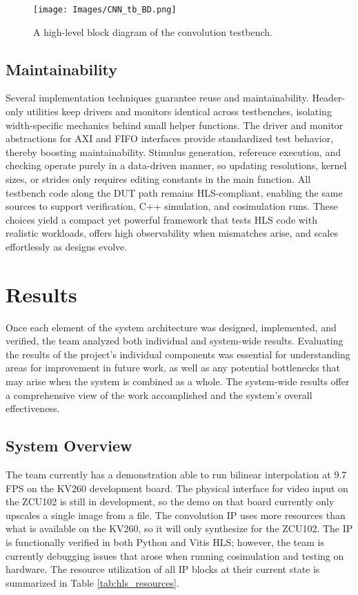 \documentclass{article}
\begin{document}
        \begin{figure}[!tb] 
            \centering
            \texttt{[image: Images/CNN\_tb\_BD.png]} 
            \caption{A high-level block diagram of the convolution testbench.} 
            \label{fig:CNN_tb_BD} 
        \end{figure}

    \subsection{Maintainability}
    \noindent Several implementation techniques guarantee reuse and maintainability. Header-only utilities keep drivers and monitors identical across testbenches, isolating width-specific mechanics behind small helper functions. The driver and monitor abstractions for AXI and FIFO interfaces provide standardized test behavior, thereby boosting maintainability. Stimulus generation, reference execution, and checking operate purely in a data-driven manner, so updating resolutions, kernel sizes, or strides only requires editing constants in the main function. All testbench code along the DUT path remains HLS-compliant, enabling the same sources to support verification, C++ simulation, and cosimulation runs. These choices yield a compact yet powerful framework that tests HLS code with realistic workloads, offers high observability when mismatches arise, and scales effortlessly as designs evolve.


\newpage\section{Results}
    \noindent Once each element of the system architecture was designed, implemented, and verified, the team analyzed both individual and system-wide results. Evaluating the results of the project’s individual components was essential for understanding areas for improvement in future work, as well as any potential bottlenecks that may arise when the system is combined as a whole. The system-wide results offer a comprehensive view of the work accomplished and the system’s overall effectiveness. 

    \subsection{System Overview}
    \noindent The team currently has a demonstration able to run bilinear interpolation at 9.7 FPS on the KV260 development board. The physical interface for video input on the ZCU102 is still in development, so the demo on that board currently only upscales a single image from a file. The convolution IP uses more resources than what is available on the KV260, so it will only synthesize for the ZCU102. The IP is functionally verified in both Python and Vitis HLS; however, the team is currently debugging issues that arose when running cosimulation and testing on hardware. The resource utilization of all IP blocks at their current state is summarized in Table \ref{tab:hls_resources}.
\end{document}
